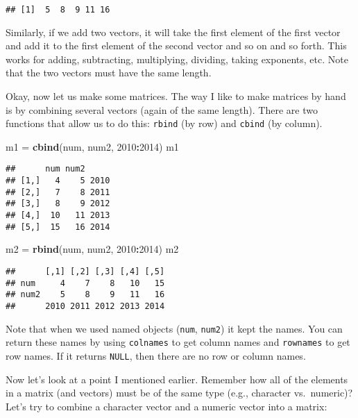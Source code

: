 \documentclass[]{book}
\newenvironment{Shaded}{\begin{snugshade}}{\end{snugshade}}
\newcommand{\KeywordTok}[1]{\textcolor[rgb]{0.13,0.29,0.53}{\textbf{#1}}}
\newcommand{\DecValTok}[1]{\textcolor[rgb]{0.00,0.00,0.81}{#1}}
\newcommand{\StringTok}[1]{\textcolor[rgb]{0.31,0.60,0.02}{#1}}
\newcommand{\OperatorTok}[1]{\textcolor[rgb]{0.81,0.36,0.00}{\textbf{#1}}}
\newcommand{\NormalTok}[1]{#1}
\theoremstyle{definition}
\theoremstyle{definition}
\theoremstyle{definition}
\theoremstyle{remark}
\begin{document}
\begin{verbatim}
## [1]  5  8  9 11 16
\end{verbatim}

Similarly, if we add two vectors, it will take the first element of the
first vector and add it to the first element of the second vector and so
on and so forth. This works for adding, subtracting, multiplying,
dividing, taking exponents, etc. Note that the two vectors must have the
same length.

Okay, now let us make some matrices. The way I like to make matrices by
hand is by combining several vectors (again of the same length). There
are two functions that allow us to do this: \texttt{rbind} (by row) and
\texttt{cbind} (by column).

\begin{Shaded}
\begin{Highlighting}[]
\NormalTok{m1 =}\StringTok{ }\KeywordTok{cbind}\NormalTok{(num, num2, }\DecValTok{2010}\OperatorTok{:}\DecValTok{2014}\NormalTok{)}
\NormalTok{m1}
\end{Highlighting}
\end{Shaded}

\begin{verbatim}
##      num num2     
## [1,]   4    5 2010
## [2,]   7    8 2011
## [3,]   8    9 2012
## [4,]  10   11 2013
## [5,]  15   16 2014
\end{verbatim}

\begin{Shaded}
\begin{Highlighting}[]
\NormalTok{m2 =}\StringTok{ }\KeywordTok{rbind}\NormalTok{(num, num2, }\DecValTok{2010}\OperatorTok{:}\DecValTok{2014}\NormalTok{)}
\NormalTok{m2}
\end{Highlighting}
\end{Shaded}

\begin{verbatim}
##      [,1] [,2] [,3] [,4] [,5]
## num     4    7    8   10   15
## num2    5    8    9   11   16
##      2010 2011 2012 2013 2014
\end{verbatim}

Note that when we used named objects (\texttt{num}, \texttt{num2}) it
kept the names. You can return these names by using \texttt{colnames} to
get column names and \texttt{rownames} to get row names. If it returns
\texttt{NULL}, then there are no row or column names.

Now let's look at a point I mentioned earlier. Remember how all of the
elements in a matrix (and vectors) must be of the same type (e.g.,
character vs.~numeric)? Let's try to combine a character vector and a
numeric vector into a matrix:
\end{document}
